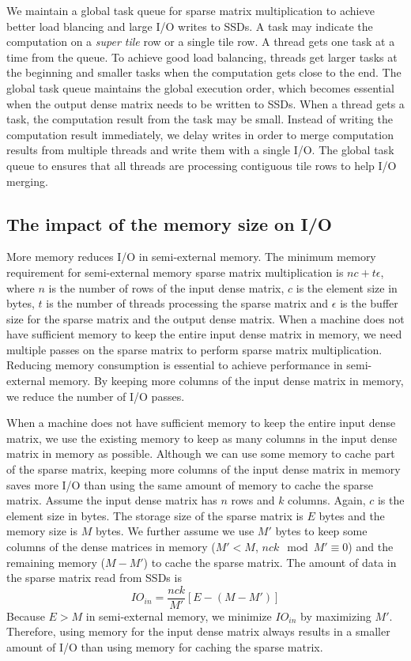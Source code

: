 We maintain a global task queue for sparse matrix multiplication to achieve
better load blancing and large I/O writes to SSDs. A task may indicate
the computation on a \textit{super tile} row or a single tile row.
A thread gets one task at a time from the queue. To achieve good load balancing,
threads get larger tasks at the beginning and smaller tasks when the computation
gets close to the end. The global task queue maintains the global execution
order, which becomes essential
when the output dense matrix needs to be written to SSDs. When a thread gets
a task, the computation result from the task may be small. Instead of
writing the computation result immediately, we delay writes in order to merge
computation results from multiple threads and write them with a single I/O.
The global task queue to ensures that all threads are processing contiguous
tile rows to help I/O merging.

\subsection{The impact of the memory size on I/O}
\label{sec:mem}
More memory reduces I/O in semi-external memory.
The minimum memory requirement for semi-external memory sparse matrix
multiplication is $n c + t \epsilon$, where $n$ is the number of rows
of the input dense matrix, $c$ is the element size in bytes,
$t$ is the number of threads processing the sparse matrix
and $\epsilon$ is the buffer size for the sparse matrix and the output
dense matrix. When a machine does not have sufficient memory to keep the entire
input dense matrix in memory, we need multiple passes on the sparse matrix to
perform sparse matrix multiplication. Reducing memory consumption is essential
to achieve performance in semi-external memory. By keeping more columns of
the input dense matrix in memory, we reduce the number of I/O passes.

When a machine does not have sufficient memory to keep the entire input dense
matrix, we use the existing memory to keep as many columns in the input
dense matrix in memory as possible. Although we can use some memory to cache
part of the sparse matrix,
keeping more columns of the input dense matrix in memory saves more I/O than
using the same amount of memory to cache the sparse matrix. Assume the input
dense matrix has $n$ rows and $k$ columns. Again, $c$ is the element size
in bytes. The storage size of the sparse
matrix is $E$ bytes and the memory size is $M$ bytes. We further assume
we use $M'$ bytes to keep some columns of the dense matrices in memory
($M' < M$, ${n c k} \mod {M'} \equiv 0$)
and the remaining memory ($M - M'$) to cache the sparse matrix.
The amount of data in the sparse matrix read from SSDs is
\begin{equation*}
IO_{in} = \frac{n c k}{M'} [E - (M - M')]
\end{equation*}
Because $E > M$ in semi-external memory, we minimize $IO_{in}$ by maximizing $M'$.
Therefore, using memory for the input dense matrix always results in a smaller
amount of I/O than using memory for caching the sparse matrix.

